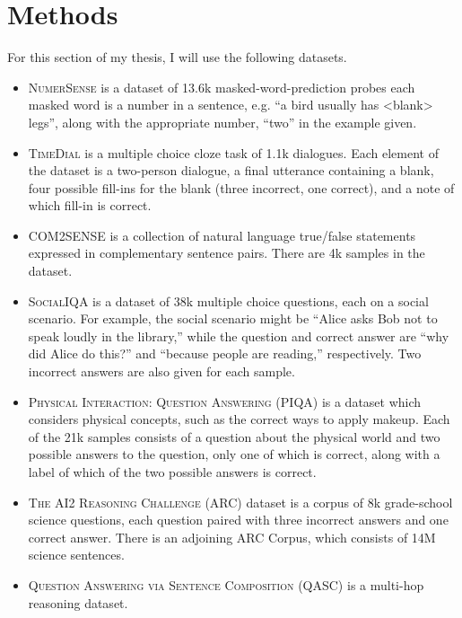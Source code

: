 \documentclass[12pt]{report}
\begin{document}
\section{Methods}

For this section of my thesis, I will use the following datasets.

\begin{itemize}
    \item
        \textsc{NumerSense} \cite{Lin2020-ik} is a dataset of 13.6k masked-word-prediction probes each masked word is a number in a sentence, e.g. \enquote{a bird usually has <blank> legs}, along with the appropriate number, \enquote{two} in the example given.
    \item
        \textsc{TimeDial} \cite{Qin2021-jy} is a multiple choice cloze task of 1.1k dialogues. Each element of the dataset is a two-person dialogue, a final utterance containing a blank, four possible fill-ins for the blank (three incorrect, one correct), and a note of which fill-in is correct.
    \item
        \textsc{COM2SENSE} \cite{Singh2021-ui} is a collection of natural language true/false statements expressed in complementary sentence pairs. There are 4k samples in the dataset.
    \item
        \textsc{SocialIQA} \cite{Sap2019-hu} is a dataset of 38k multiple choice questions, each on a social scenario.
        For example, the social scenario might be \enquote{Alice asks Bob not to speak loudly in the library,} while the question and correct answer are \enquote{why did Alice do this?} and \enquote{because people are reading,} respectively.
        Two incorrect answers are also given for each sample.
    \item
        \textsc{Physical Interaction: Question Answering (PIQA)} \cite{Bisk2020-hw} is a dataset which considers physical concepts, such as the correct ways to apply makeup.
        Each of the 21k samples consists of a question about the physical world and two possible answers to the question, only one of which is correct, along with a label of which of the two possible answers is correct.
    \item
        \textsc{The AI2 Reasoning Challenge (ARC)} \cite{Clark2018-md} dataset is a corpus of 8k grade-school science questions, each question paired with three incorrect answers and one correct answer.
        There is an adjoining ARC Corpus, which consists of 14M science sentences.
    \item
        \textsc{Question Answering via Sentence Composition (QASC)} \cite{Khot2020-dh} is a multi-hop reasoning dataset.

\end{itemize}
\end{document}

